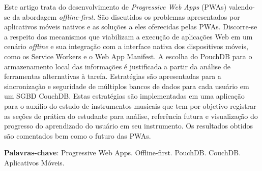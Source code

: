 \documentclass[
	article,			%
	12pt,				%
	oneside,			%
	a4paper,			%
	english,			%
	brazil,				%
	sumario=tradicional
	]{abntex2}
\begin{document}

\frenchspacing 


%
%
\maketitle

\begin{resumoumacoluna}
Este artigo trata do desenvolvimento de \textit{Progressive Web Apps} (PWAs) valendo-se da abordagem \textit{offline-first}. São discutidos os problemas apresentados por aplicativos móveis nativos e as soluções a eles oferecidas pelas PWAs. Discorre-se a respeito dos mecanismos que viabilizam a execução de aplicações Web em um cenário \textit{offline} e sua integração com a interface nativa dos dispositivos móveis, como os Service Workers e o Web App Manifest. A escolha do PouchDB para o armazenamento local das informações é justificada a partir da análise de ferramentas alternativas à tarefa. Estratégias são apresentadas para a sincronização e seguridade de múltiplos bancos de dados para cada usuário em um SGBD CouchDB. Estas estratégias são implementadas em uma aplicação para o auxílio do estudo de instrumentos musicais que tem por objetivo registrar as seções de prática do estudante para análise, referência futura e visualização do progresso do aprendizado do usuário em seu instrumento. Os resultados obtidos são comentados bem como o futuro das PWAs.
\vspace{\onelineskip}

\noindent
\textbf{Palavras-chave}: Progressive Web Apps. Offline-first. PouchDB. CouchDB. Aplicativos Móveis.
\end{resumoumacoluna}


\textual
\end{document}
